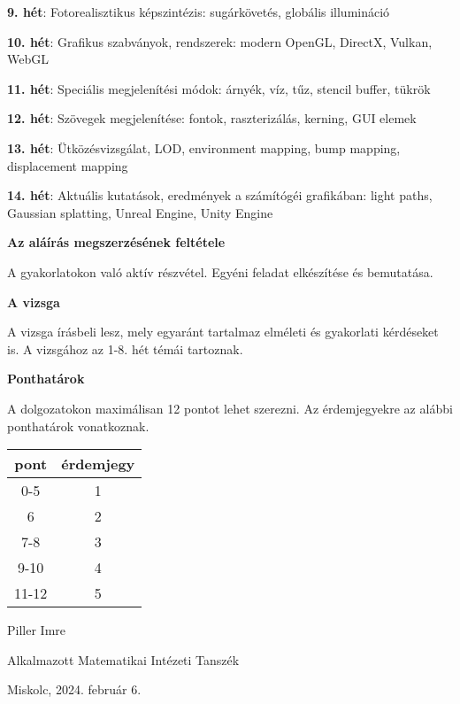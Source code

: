\documentclass[a4paper,12pt]{article}
\begin{document}
\noindent \textbf{9. hét}:
Fotorealisztikus képszintézis: sugárkövetés, globális illumináció

\bigskip

\noindent \textbf{10. hét}:
Grafikus szabványok, rendszerek: modern OpenGL, DirectX, Vulkan, WebGL

\bigskip

\noindent \textbf{11. hét}:
Speciális megjelenítési módok: árnyék, víz, tűz, stencil buffer, tükrök

\bigskip

\noindent \textbf{12. hét}:
Szövegek megjelenítése: fontok, raszterizálás, kerning, GUI elemek

\bigskip

\noindent \textbf{13. hét}:
Ütközésvizsgálat, LOD, environment mapping, bump mapping, displacement mapping

\bigskip

\noindent \textbf{14. hét}:
Aktuális kutatások, eredmények a számítógéi grafikában: light paths, Gaussian splatting, Unreal Engine, Unity Engine

\newpage

\noindent \textbf{Az aláírás megszerzésének feltétele}

\noindent A gyakorlatokon való aktív részvétel. Egyéni feladat elkészítése és bemutatása.

\vskip 1cm

\noindent \textbf{A vizsga}

\noindent A vizsga írásbeli lesz, mely egyaránt tartalmaz elméleti és gyakorlati kérdéseket is. A vizsgához az 1-8. hét témái tartoznak.

\vskip 1cm

\noindent \textbf{Ponthatárok}

\noindent A dolgozatokon maximálisan 12 pontot lehet szerezni. Az érdemjegyekre az alábbi ponthatárok vonatkoznak.

\begin{center}
\begin{tabular}{|c|c|}
pont & érdemjegy \\
\hline
0-5 & 1 \\
6 & 2 \\
7-8 & 3 \\
9-10 & 4 \\
11-12 & 5 \\
\hline
\end{tabular}
\end{center}

\vskip 18mm

\hskip 10cm Piller Imre

\hskip 7cm Alkalmazott Matematikai Intézeti Tanszék

\vskip 5mm

\noindent Miskolc, 2024. február 6.
\end{document}
